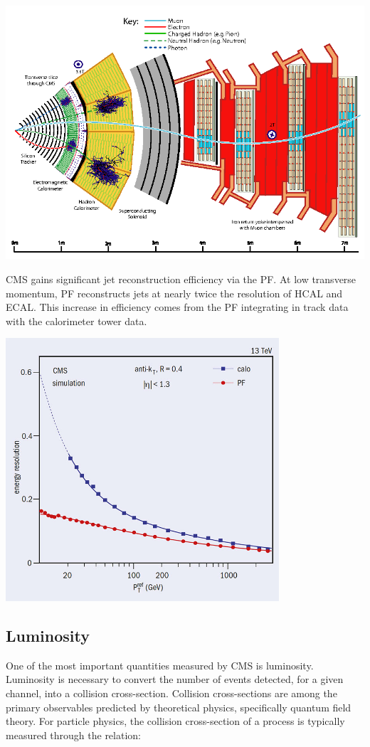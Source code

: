 \centerline{
\includegraphics[width=5.5in]{Chapter3/importfigs/Figure_001.png}
}

CMS gains significant jet reconstruction efficiency via the PF. At low transverse momentum, PF reconstructs jets at nearly twice the resolution of HCAL and ECAL. This increase in efficiency comes from the PF integrating in track data with the calorimeter tower data. 

\centerline{
\includegraphics[width=4in]{Chapter3/importfigs/CCrec2_05_16.jpg}
}

\subsection{Luminosity}

One of the most important quantities measured by CMS is luminosity. Luminosity is necessary to convert the number of events detected, for a given channel, into a collision cross-section. Collision cross-sections are among the primary observables predicted by theoretical physics, specifically quantum field theory. For particle physics, the collision cross-section of a process is typically measured through the relation:

